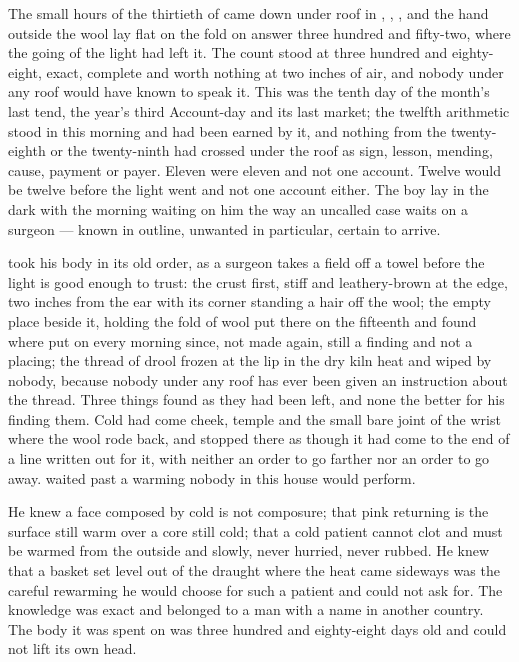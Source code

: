 
The small hours of the thirtieth of  came down under  roof in , , , and the hand outside the wool lay flat on the fold on answer three hundred and fifty-two, where the going of the light had left it. The count stood at three hundred and eighty-eight, exact, complete and worth nothing at two inches of air, and nobody under any roof would have known to speak it. This was the tenth day of the month's last tend, the year's third Account-day and its last market; the twelfth arithmetic stood in this morning and had been earned by it, and nothing from the twenty-eighth or the twenty-ninth had crossed under the roof as sign, lesson, mending, cause, payment or payer. Eleven were eleven and not one account. Twelve would be twelve before the light went and not one account either. The boy lay in the dark with the morning waiting on him the way an uncalled case waits on a surgeon --- known in outline, unwanted in particular, certain to arrive.

 took his body in its old order, as a surgeon takes a field off a towel before the light is good enough to trust: the crust first, stiff and leathery-brown at the edge, two inches from the ear with its corner standing a hair off the wool; the empty place beside it, holding the fold of wool put there on the fifteenth and found where put on every morning since, not made again, still a finding and not a placing; the thread of drool frozen at the lip in the dry kiln heat and wiped by nobody, because nobody under any roof has ever been given an instruction about the thread. Three things found as they had been left, and none the better for his finding them. Cold had come cheek, temple and the small bare joint of the wrist where the wool rode back, and stopped there as though it had come to the end of a line written out for it, with neither an order to go farther nor an order to go away.  waited past a warming nobody in this house would perform.

He knew a face composed by cold is not composure; that pink returning is the surface still warm over a core still cold; that a cold patient cannot clot and must be warmed from the outside and slowly, never hurried, never rubbed. He knew that a basket set level out of the draught where the heat came sideways was the careful rewarming he would choose for such a patient and could not ask for. The knowledge was exact and belonged to a man with a name in another country. The body it was spent on was three hundred and eighty-eight days old and could not lift its own head.

